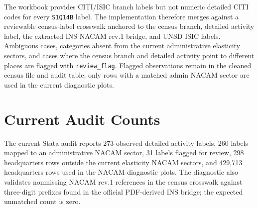 \documentclass[11pt]{article}
\begin{document}
The workbook provides CITI/ISIC branch labels but not numeric detailed CITI codes for every \texttt{S1Q14B} label. The implementation therefore merges against a reviewable census-label crosswalk anchored to the census branch, detailed activity label, the extracted INS NACAM rev.1 bridge, and UNSD ISIC labels. Ambiguous cases, categories absent from the current administrative elasticity sectors, and cases where the census branch and detailed activity point to different places are flagged with \texttt{review\_flag}. Flagged observations remain in the cleaned census file and audit table; only rows with a matched admin NACAM sector are used in the current diagnostic plots.

\section*{Current Audit Counts}

The current Stata audit reports 273 observed detailed activity labels, 260 labels mapped to an administrative NACAM sector, 31 labels flagged for review, 298 headquarters rows outside the current elasticity NACAM sectors, and 429,713 headquarters rows used in the NACAM diagnostic plots. The diagnostic also validates nonmissing NACAM rev.1 references in the census crosswalk against three-digit prefixes found in the official PDF-derived INS bridge; the expected unmatched count is zero.
\end{document}
